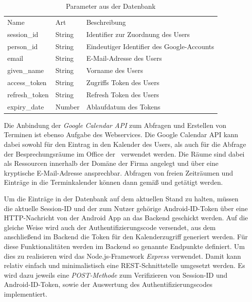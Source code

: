 \begin{table}[H]
\centering
 \begin{tabular}{ | C{3cm} || C{1.5cm} || C{7cm} |} 
 \hline
 Name & Art & Beschreibung \\
 \hhline{=::==}
 \hline session\_id & String & Identifier zur Zuordnung des Users \\ 
 \hline person\_id & String & Eindeutiger Identifier des Google-Accounts \\ 
 \hline email & String & E-Mail-Adresse des Users \\ 
 \hline given\_name & String & Vorname des Users \\ 
 \hline access\_token & String & Zugriffs Token des Users \\ 
 \hline refresh\_token & String & Refresh Token des Users \\
 \hline expiry\_date & Number  & Ablaufdatum des Tokens \\ 
 \hline
\end{tabular}
\caption{Parameter aus der Datenbank}
\label{tab:data-datenbank}
\end{table}

Die Anbindung der \textit{Google Calendar \ac{API}} zum Abfragen und Erstellen von Terminen ist ebenso Aufgabe des Webservices. Die Google Calendar \ac{API} kann dabei sowohl für den Eintrag in den Kalender des Users, als auch für die Abfrage der Besprechungsräume im Office der \adorsys\ verwendet werden. Die Räume sind dabei als Ressourcen innerhalb der Domäne der Firma angelegt und über eine kryptische E-Mail-Adresse ansprechbar. Abfragen von freien Zeiträumen und Einträge in die Terminkalender können dann gemäß \cite{google_developers_node.js_2018} und \cite{google_developers_create_2018} getätigt werden.

Um die Einträge in der Datenbank auf dem aktuellen Stand zu halten, müssen die aktuelle Session-\ac{ID} und der zum Nutzer gehörige Android-\ac{ID}-Token über eine \ac{HTTP}-Nachricht von der Android App an das Backend geschickt werden. Auf die gleiche Weise wird auch der Authentifizierungscode versendet, aus dem anschließend im Backend die Token für den Kalenderzugriff generiert werden. Für diese Funktionalitäten werden im Backend so genannte Endpunkte definiert. Um dies zu realisieren wird das Node.js-Framework \textit{Express} verwendet. Damit kann relativ einfach und minimalistisch eine \ac{REST}-Schnittstelle umgesetzt werden. Es wird dazu jeweils eine \textit{POST-Methode} zum Verifizieren von Session-\ac{ID} und Android-\ac{ID}-Token, sowie der Auswertung des Authentifizierungscodes implementiert.

